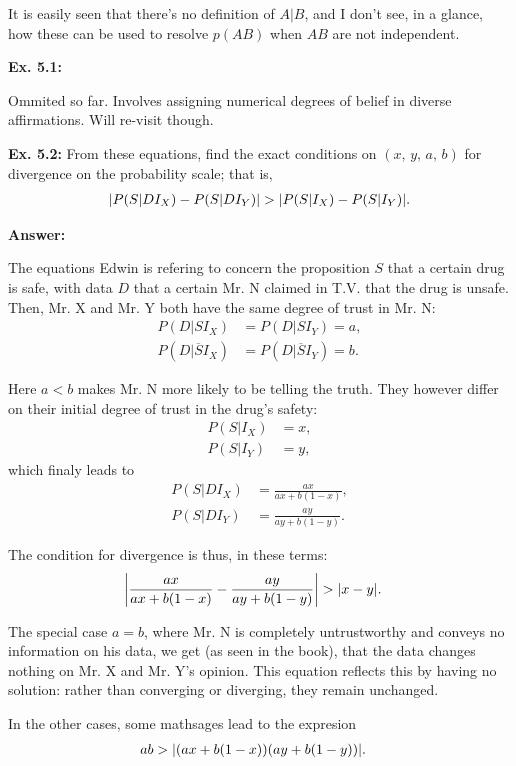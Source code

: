 \documentclass{article}
\begin{document}
It is easily seen that there's no definition of $A|B$, and I don't see, in a glance, how these can be used to resolve $p(AB)$ when $AB$ are not independent.

\textbf{Ex. 5.1: }

Ommited so far. Involves assigning numerical degrees of belief in diverse affirmations. Will re-visit though.

\textbf{Ex. 5.2: }From these equations, find the exact conditions on $(x,\,y,\,a,\,b)$ for divergence on the probability scale; that is,
\begin{align*}
	\abs{P(S|DI_X)-P(S|DI_Y)}>\abs{P(S|I_X)-P(S|I_Y)}.
\end{align*}

\textbf{Answer:}

The equations Edwin is refering to concern the proposition $S$ that a certain drug is safe, with data $D$ that a certain Mr. N claimed in T.V. that the drug is unsafe. Then, Mr. X and Mr. Y both have the same degree of trust in Mr. N:
\begin{align*}
	P(D|SI_X)&=P(D|SI_Y)=a,\\
	P(D|\overline{S}I_X)&=P(D|\overline{S}I_Y)=b.
\end{align*}

Here $a<b$ makes Mr. N more likely to be telling the truth. They however differ on their initial degree of trust in the drug's safety:
\begin{align*}
	P(S|I_X)&=x,\\
	P(S|I_Y)&=y,
\end{align*}
which finaly leads to
\begin{align*}
	P(S|DI_X)&=\frac{ax}{ax+b(1-x)},\\
	P(S|DI_Y)&=\frac{ay}{ay+b(1-y)}.
\end{align*}

The condition for divergence is thus, in these terms:
\begin{align*}
	\abs{\frac{ax}{ax+b(1-x)}-\frac{ay}{ay+b(1-y)}}&>\abs{x-y}.
\end{align*}

The special case $a=b$, where Mr. N is completely untrustworthy and conveys no information on his data, we get (as seen in the book), that the data changes nothing on Mr. X and Mr. Y's opinion. This equation reflects this by having no solution: rather than converging or diverging, they remain unchanged.

In the other cases, some mathsages lead to the expresion
\begin{align*}
	ab&>\abs{(ax+b(1-x))(ay+b(1-y))}.
\end{align*}
\end{document}
